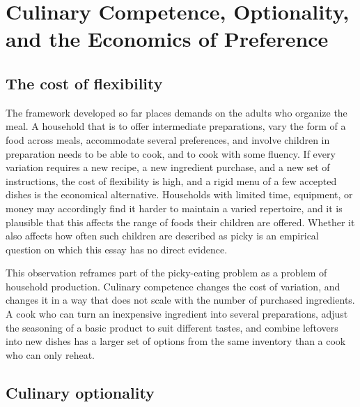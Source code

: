 \documentclass[11pt]{article}
\theoremstyle{remark}
\begin{document}
\section{Culinary Competence, Optionality, and the Economics of Preference}\label{sec:economics}

\subsection{The cost of flexibility}

The framework developed so far places demands on the adults who organize the meal. A household that is to offer intermediate preparations, vary the form of a food across meals, accommodate several preferences, and involve children in preparation needs to be able to cook, and to cook with some fluency. If every variation requires a new recipe, a new ingredient purchase, and a new set of instructions, the cost of flexibility is high, and a rigid menu of a few accepted dishes is the economical alternative. Households with limited time, equipment, or money may accordingly find it harder to maintain a varied repertoire, and it is plausible that this affects the range of foods their children are offered. Whether it also affects how often such children are described as picky is an empirical question on which this essay has no direct evidence.

This observation reframes part of the picky-eating problem as a problem of household production. Culinary competence changes the cost of variation, and changes it in a way that does not scale with the number of purchased ingredients. A cook who can turn an inexpensive ingredient into several preparations, adjust the seasoning of a basic product to suit different tastes, and combine leftovers into new dishes has a larger set of options from the same inventory than a cook who can only reheat.

\subsection{Culinary optionality}
\end{document}
